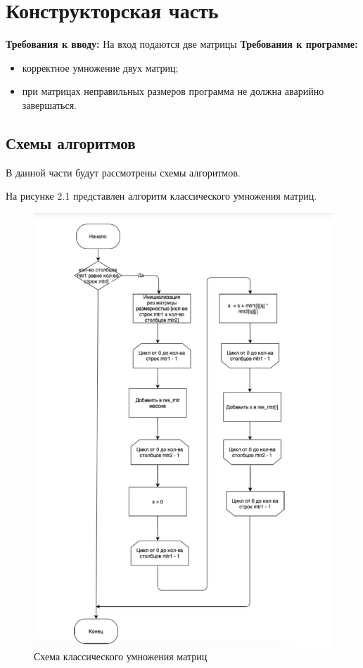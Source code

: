 \documentclass[12pt]{report}
\begin{document}
\chapter{Конструкторская часть}
\textbf{Требования к вводу:}
На вход подаются две матрицы
\newline
\textbf{Требования к программе:}
\begin{itemize}
\item корректное умножение двух матриц;
\item при матрицах неправильных размеров программа не должна аварийно завершаться.
\end{itemize}

\section{Схемы алгоритмов}
В данной части будут рассмотрены схемы алгоритмов.

На рисунке 2.1 представлен алгоритм классического умножения матриц.
\begin{figure}[H]
    \centering
    \includegraphics[width=0.70\linewidth]{1.jpg}
    \caption{Схема классического умножения матриц}
    \label{fig:mpr}
\end{figure}
\end{document}
